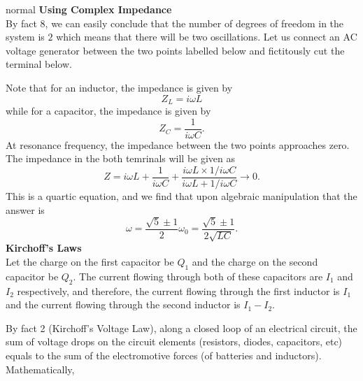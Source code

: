 \begin{solution}{normal}
\textbf{Using Complex Impedance}
\\
By fact 8, we can easily conclude that the number of degrees of freedom in the system is $2$ which means that there will be two oscillations. Let us connect an AC voltage generator between the two points labelled below and fictitously cut the terminal below. 
\begin{center}
\end{center}
Note that for an inductor, the impedance is given by 
\[Z_L = i\omega L\]
while for a capacitor, the impedance is given by 
\[Z_C = \frac{1}{i\omega C}.\]
At resonance frequency, the impedance between the two points approaches zero. The impedance in the both temrinals will be given as 
\[Z = i\omega L + \frac{1}{i\omega C } + \frac{i\omega L \times 1/i\omega C}{i\omega L + 1/i\omega C}\to 0.\]
This is a quartic equation, and we find that upon algebraic manipulation that the answer is 
\[\omega = \frac{\sqrt{5} \pm 1}{2}\omega_0 = \frac{\sqrt{5} \pm 1}{2\sqrt{LC}}.\]
\tcbline
\textbf{Kirchoff's Laws}
\\
Let the charge on the first capacitor be $Q_1$ and the charge on the second capacitor be $Q_2$. The current flowing through both of these capacitors are $I_1$ and $I_2$ respectively, and therefore, the current flowing through the first inductor is $I_1$ and the current flowing through the second inductor is $I_1 - I_2$. 
\begin{center}
\end{center}
By fact 2 (Kirchoff's Voltage Law), along a closed loop of an electrical circuit, the sum of voltage drops on the circuit elements (resistors, diodes, capacitors, etc) equals to the sum of the electromotive forces (of batteries and inductors). Mathematically,

\end{solution}
